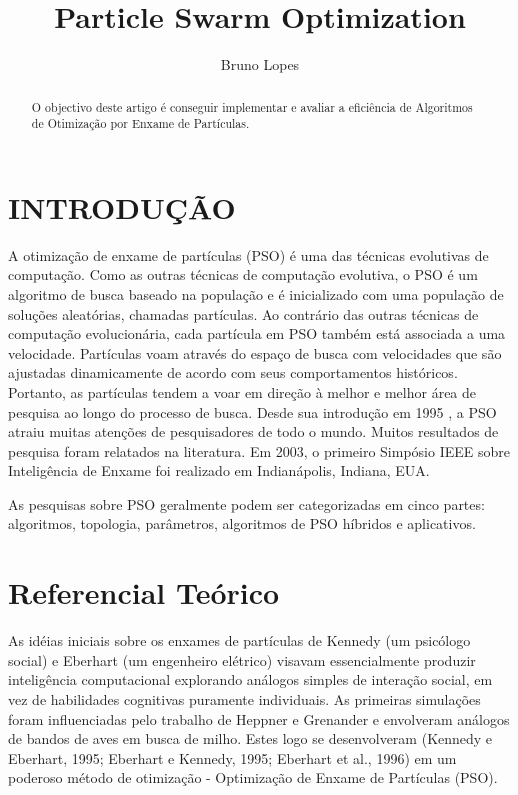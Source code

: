 \documentclass[conference]{IEEEtran}
\begin{document}
\title{Particle Swarm Optimization}

\author{Bruno Lopes}
\maketitle

\begin{abstract}
O objectivo deste artigo é conseguir implementar e avaliar a eficiência de Algoritmos de Otimização por Enxame de Partículas.

\end{abstract}

\section{INTRODUÇÃO}
	A otimização de enxame de partículas (PSO) é uma das técnicas evolutivas de computação. Como as outras técnicas de computação evolutiva, o PSO é um algoritmo de busca baseado na população e é inicializado com uma população de soluções aleatórias, chamadas partículas. Ao contrário das outras técnicas de computação evolucionária, cada partícula em PSO também está associada a uma velocidade. Partículas voam através do espaço de busca com velocidades que são ajustadas dinamicamente de acordo com seus comportamentos históricos. Portanto, as partículas tendem a voar em direção à melhor e melhor área de pesquisa ao longo do processo de busca. Desde sua introdução em 1995 \cite{b1}, a PSO atraiu muitas atenções de pesquisadores de todo o mundo. Muitos resultados de pesquisa foram relatados na literatura. Em 2003, o primeiro Simpósio IEEE sobre Inteligência de Enxame foi realizado em Indianápolis, Indiana, EUA. 
		
	As pesquisas sobre PSO geralmente podem ser categorizadas em cinco partes: algoritmos, topologia, parâmetros, algoritmos de PSO híbridos e aplicativos.

\section{Referencial Teórico}
	As idéias iniciais sobre os enxames de partículas de Kennedy (um psicólogo social) e Eberhart (um engenheiro elétrico) visavam essencialmente produzir inteligência computacional explorando análogos simples de interação social, em vez de habilidades cognitivas puramente individuais. As primeiras simulações \cite{b1} foram influenciadas pelo trabalho de Heppner e Grenander \cite{b2} e envolveram análogos de bandos de aves em busca de milho. Estes logo se desenvolveram (Kennedy e Eberhart, 1995; Eberhart e Kennedy, 1995; Eberhart et al., 1996) em um poderoso método de otimização - Optimização de Enxame de Partículas (PSO).
\end{document}
